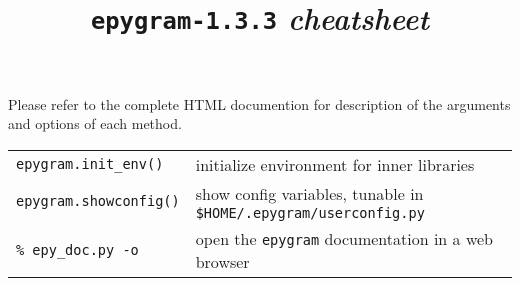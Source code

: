 \documentclass[a4paper,10pt]{article}
\title{\texttt{epygram-1.3.3} \textit{cheatsheet}}
\date{\vspace{-1.5cm}}
\begin{document}
\maketitle
Please refer to the complete HTML documention for description of the arguments and options of each method.\\

\begin{tabular}{|p{9.5cm}|p{9.5cm}|}
\rowcolor{gray!50}
\multicolumn{2}{|c|}{\textbf{Miscellaneous}}\\
\hline
\texttt{epygram.init\_env()} & initialize environment for inner libraries\\
\texttt{epygram.showconfig()} & show config variables, tunable in \texttt{\$HOME/.epygram/userconfig.py}\\
\texttt{\% epy\_doc.py -o} & open the \texttt{epygram} documentation in a web browser\\
\hline
\end{tabular}\\
\\

\end{document}
